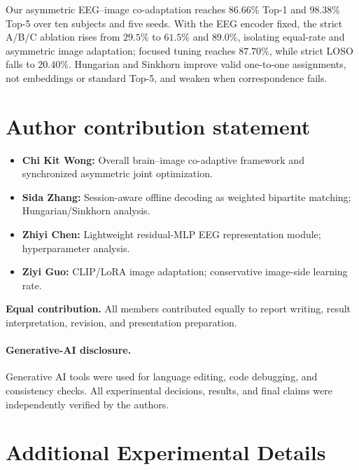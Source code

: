 \documentclass{article}
\begin{document}
Our asymmetric EEG--image co-adaptation reaches $86.66\%$ Top-1 and $98.38\%$ Top-5 over ten subjects and five seeds. With the EEG encoder fixed, the strict A/B/C ablation rises from $29.5\%$ to $61.5\%$ and $89.0\%$, isolating equal-rate and asymmetric image adaptation; focused tuning reaches $87.70\%$, while strict LOSO falls to $20.40\%$. Hungarian and Sinkhorn improve valid one-to-one assignments, not embeddings or standard Top-5, and weaken when correspondence fails.

\section*{Author contribution statement}
\label{sec:contributions}
{\small
\begin{itemize}[nosep,leftmargin=*]
  \item \textbf{Chi Kit Wong:} Overall brain--image co-adaptive framework and synchronized asymmetric joint optimization.
  \item \textbf{Sida Zhang:} Session-aware offline decoding as weighted bipartite matching; Hungarian/Sinkhorn analysis.
  \item \textbf{Zhiyi Chen:} Lightweight residual-MLP EEG representation module; hyperparameter analysis.
  \item \textbf{Ziyi Guo:} CLIP/LoRA image adaptation; conservative image-side learning rate.
\end{itemize}
\noindent\textbf{Equal contribution.} All members contributed equally to report writing, result interpretation, revision, and presentation preparation.
}

\paragraph{Generative-AI disclosure.}
Generative AI tools were used for language editing, code debugging, and consistency checks. All experimental decisions, results, and final claims were independently verified by the authors.



\label{sec:body_end}
\clearpage
{}
\label{sec:references}




\clearpage

\appendix

\section{Additional Experimental Details}
\label{app:experimental_details}
\end{document}
